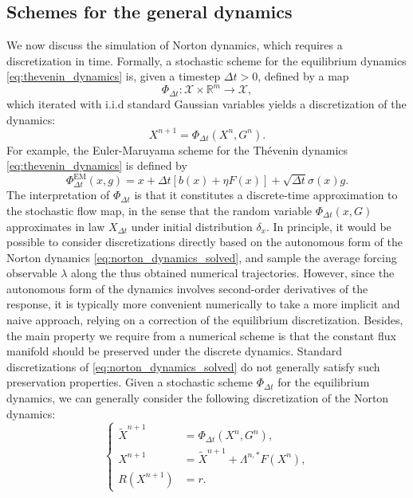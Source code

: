 \documentclass[pdflatex,sn-mathphys]{sn-jnl}%
\theoremstyle{thmstyleone}%
\theoremstyle{thmstyletwo}%
\theoremstyle{thmstylethree}%
\newcommand{\1}{\mathbbm{1}}
\begin{document}
\subsection{Schemes for the general dynamics}
We now discuss the simulation of Norton dynamics, which requires a discretization in time.
Formally, a stochastic scheme for the equilibrium dynamics \eqref{eq:thevenin_dynamics} is, given a timestep $\Delta t>0$, defined by a map
\begin{equation}
    \label{eq:general_scheme}
    \Phi_{\Delta t} : \mathcal X \times \mathbb{R}^m \to \mathcal X,
\end{equation}
which iterated with i.i.d standard Gaussian variables yields a discretization of the dynamics:
\begin{equation}
    X^{n+1} = \Phi_{\Delta t}(X^n,G^n).
\end{equation}
For example, the Euler-Maruyama scheme for the Th\'evenin dynamics \eqref{eq:thevenin_dynamics} is defined by
\begin{equation}
    \label{eq:em_scheme}
    \Phi^{\mathrm{EM}}_{\Delta t}(x,g)=x + \Delta t \left[b(x) +\eta F(x)\right] +\sqrt{\Delta t}\sigma(x)g.
\end{equation}
The interpretation of $\Phi_{\Delta t}$ is that it constitutes a discrete-time approximation to the stochastic flow map, in the sense that the random variable $\Phi_{\Delta t}(x,G)$ approximates in law $X_{\Delta t}$ under initial distribution $\delta_x$.
In principle, it would be possible to consider discretizations directly based on the autonomous form of the Norton dynamics \eqref{eq:norton_dynamics_solved}, and sample the average forcing observable $\lambda$ along the thus obtained numerical trajectories.
However, since the autonomous form of the dynamics involves second-order derivatives of the response, it is typically more convenient numerically to take a more implicit and naive approach, relying on a correction of the equilibrium discretization. Besides, the main property we require from a numerical scheme is that the constant flux manifold should be preserved under the discrete dynamics. Standard discretizations of \eqref{eq:norton_dynamics_solved} do not generally satisfy such preservation properties.
Given a stochastic scheme $\Phi_{\Delta t}$ for the equilibrium dynamics, we can generally consider the following discretization of the Norton dynamics:
\begin{equation}
    \label{eq:scheme_norton_general_sde}
    \left\{\begin{aligned}
        \widetilde{X}^{n+1} &= \Phi_{\Delta t}(X^n, G^n),\\
        X^{n+1} &= \widetilde{X}^{n+1} +\Lambda^{n,*} F(X^n),\\
        R(X^{n+1}) &=r.
    \end{aligned}\right.
\end{equation}
\end{document}
